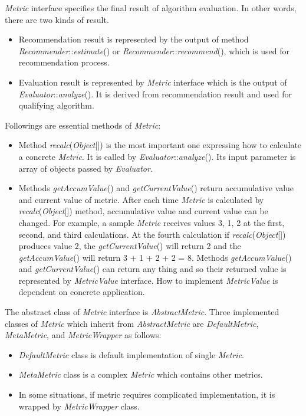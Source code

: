 \documentclass[a4paper,twoside]{article}
\begin{document}
\textit{Metric} interface specifies the final result of algorithm evaluation. In other words, there are two kinds of result.
\begin{itemize}
\item Recommendation result is represented by the output of method \textit{Recommender}::\textit{estimate}() or \textit{Recommender}::\textit{recommend}(), which is used for recommendation process.
\item Evaluation result is represented by \textit{Metric} interface which is the output of \textit{Evaluator}::\textit{analyze}(). It is derived from recommendation result and used for qualifying algorithm.
\end{itemize}
Followings are essential methods of \textit{Metric}:
\begin{itemize}
\item Method \textit{recalc}(\textit{Object}[]) is the most important one expressing how to calculate a concrete \textit{Metric}. It is called by \textit{Evaluator}::\textit{analyze}(). Its input parameter is array of objects passed by \textit{Evaluator}.
\item Methods \textit{getAccumValue}() and \textit{getCurrentValue}() return accumulative value and current value of metric. After each time \textit{Metric} is calculated by \textit{recalc}(\textit{Object}[]) method, accumulative value and current value can be changed. For example, a sample \textit{Metric} receives values 3, 1, 2 at the first, second, and third calculations. At the fourth calculation if \textit{recalc}(\textit{Object}[]) produces value 2, the \textit{getCurrentValue}() will return 2 and the \textit{getAccumValue}() will return 3 + 1 + 2 + 2 = 8. Methods \textit{getAccumValue}() and \textit{getCurrentValue}() can return any thing and so their returned value is represented by \textit{MetricValue} interface. How to implement \textit{MetricValue} is dependent on concrete application.
\end{itemize}
The abstract class of \textit{Metric} interface is \textit{AbstractMetric}. Three implemented classes of \textit{Metric} which inherit from \textit{AbstractMetric} are \textit{DefaultMetric}, \textit{MetaMetric}, and \textit{MetricWrapper} as follows:
\begin{itemize}
\item \textit{DefaultMetric} class is default implementation of single \textit{Metric}.
\item \textit{MetaMetric} class is a complex \textit{Metric} which contains other metrics.
\item In some situations, if metric requires complicated implementation, it is wrapped by \textit{MetricWrapper} class.
\end{itemize}
\end{document}

